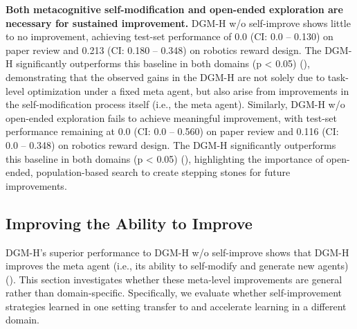 \documentclass[]{fairmeta}
\begin{document}
\textbf{Both metacognitive self-modification and open-ended exploration are necessary for sustained improvement.}
DGM-H w/o self-improve \citep{huautomated} shows little to no improvement, achieving test-set performance of 0.0 (CI: 0.0 -- 0.130) on paper review and 0.213 (CI: 0.180 -- 0.348) on robotics reward design. The DGM-H significantly outperforms this baseline in both domains (p < 0.05) (), demonstrating that the observed gains in the DGM-H are not solely due to task-level optimization under a fixed meta agent, but also arise from improvements in the self-modification process itself (i.e., the meta agent).
Similarly, DGM-H w/o open-ended exploration fails to achieve meaningful improvement, with test-set performance remaining at 0.0 (CI: 0.0 -- 0.560) on paper review and 0.116 (CI: 0.0 -- 0.348) on robotics reward design. The DGM-H significantly outperforms this baseline in both domains (p < 0.05) (), highlighting the importance of open-ended, population-based search to create stepping stones for future improvements.

\subsection{Improving the Ability to Improve}
\label{sec:results-meta}

DGM-H's superior performance to DGM-H w/o self-improve shows that DGM-H improves the meta agent (i.e., its ability to self-modify and generate new agents) (). This section investigates whether these meta-level improvements are general rather than domain-specific. Specifically, we evaluate whether self-improvement strategies learned in one setting transfer to and accelerate learning in a different domain.
\end{document}
